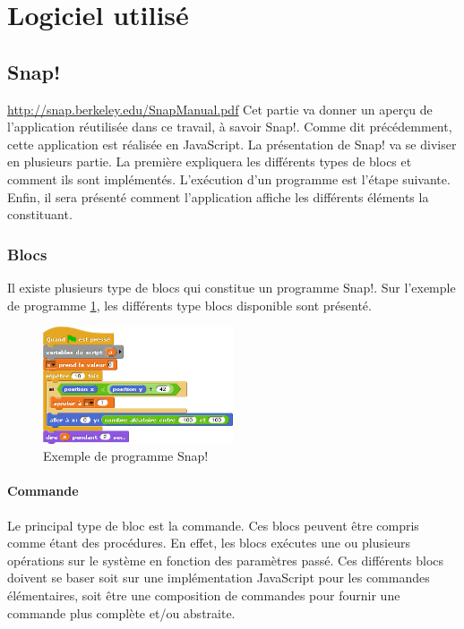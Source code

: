 \section{Logiciel utilisé}
\subsection{Snap!}
\url{http://snap.berkeley.edu/SnapManual.pdf}
Cet partie va donner un aperçu de l'application réutilisée dans ce travail, à savoir Snap!. Comme dit précédemment, cette application est réalisée en JavaScript. La présentation de Snap! va se diviser en plusieurs partie. La première expliquera les différents types de blocs et comment ils sont implémentés. L'exécution d'un programme est l'étape suivante. Enfin, il sera présenté comment l'application affiche les différents éléments la constituant.

\subsubsection{Blocs}
Il existe plusieurs type de blocs qui constitue un programme Snap!. Sur l'exemple de programme \ref{fig:software_used_script}, les différents type blocs disponible sont présenté.
\begin{figure}
  \begin{center}
    \includegraphics[width=0.5\textwidth]{content/4-theory/2-related_work/images/script}
    \caption{Exemple de programme Snap!}
    \label{fig:software_used_script}
  \end{center}
\end{figure}

\paragraph{Commande}
Le principal type de bloc est la commande. Ces blocs peuvent être compris comme étant des procédures. En effet, les blocs exécutes une ou plusieurs opérations sur le système en fonction des paramètres passé. Ces différents blocs doivent se baser soit sur une implémentation JavaScript pour les commandes élémentaires, soit être une composition de commandes pour fournir une commande plus complète et/ou abstraite.

